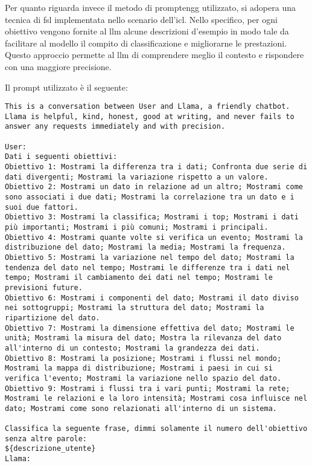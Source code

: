 \bigskip
\noindent Per quanto riguarda invece il metodo di \gls{promptengg} utilizzato, si adopera una tecnica di \gls{fsl} implementata nello scenario dell'\gls{icl}.
Nello specifico, per ogni obiettivo vengono fornite al \gls{llm} alcune descrizioni d'esempio in modo tale da facilitare al modello il compito di classificazione e migliorarne le
prestazioni. Questo approccio permette al \gls{llm} di comprendere meglio il contesto e rispondere con una maggiore precisione.

Il prompt utilizzato è il seguente:
\begin{lstlisting}[style=htmlcssjs]
This is a conversation between User and Llama, a friendly chatbot. Llama is helpful, kind, honest, good at writing, and never fails to answer any requests immediately and with precision.

User: 
Dati i seguenti obiettivi:
Obiettivo 1: Mostrami la differenza tra i dati; Confronta due serie di dati divergenti; Mostrami la variazione rispetto a un valore.
Obiettivo 2: Mostrami un dato in relazione ad un altro; Mostrami come sono associati i due dati; Mostrami la correlazione tra un dato e i suoi due fattori.
Obiettivo 3: Mostrami la classifica; Mostrami i top; Mostrami i dati più importanti; Mostrami i più comuni; Mostrami i principali.
Obiettivo 4: Mostrami quante volte si verifica un evento; Mostrami la distribuzione del dato; Mostrami la media; Mostrami la frequenza.
Obiettivo 5: Mostrami la variazione nel tempo del dato; Mostrami la tendenza del dato nel tempo; Mostrami le differenze tra i dati nel tempo; Mostrami il cambiamento dei dati nel tempo; Mostrami le previsioni future.
Obiettivo 6: Mostrami i componenti del dato; Mostrami il dato diviso nei sottogruppi; Mostrami la struttura del dato; Mostrami la ripartizione del dato.
Obiettivo 7: Mostrami la dimensione effettiva del dato; Mostrami le unità; Mostrami la misura del dato; Mostra la rilevanza del dato all'interno di un contesto; Mostrami la grandezza dei dati.
Obiettivo 8: Mostrami la posizione; Mostrami i flussi nel mondo; Mostrami la mappa di distribuzione; Mostrami i paesi in cui si verifica l'evento; Mostrami la variazione nello spazio del dato.
Obiettivo 9: Mostrami i flussi tra i vari punti; Mostrami la rete; Mostrami le relazioni e la loro intensità; Mostrami cosa influisce nel dato; Mostrami come sono relazionati all'interno di un sistema. 

Classifica la seguente frase, dimmi solamente il numero dell'obiettivo senza altre parole: 
${descrizione_utente}
Llama:
\end{lstlisting}

